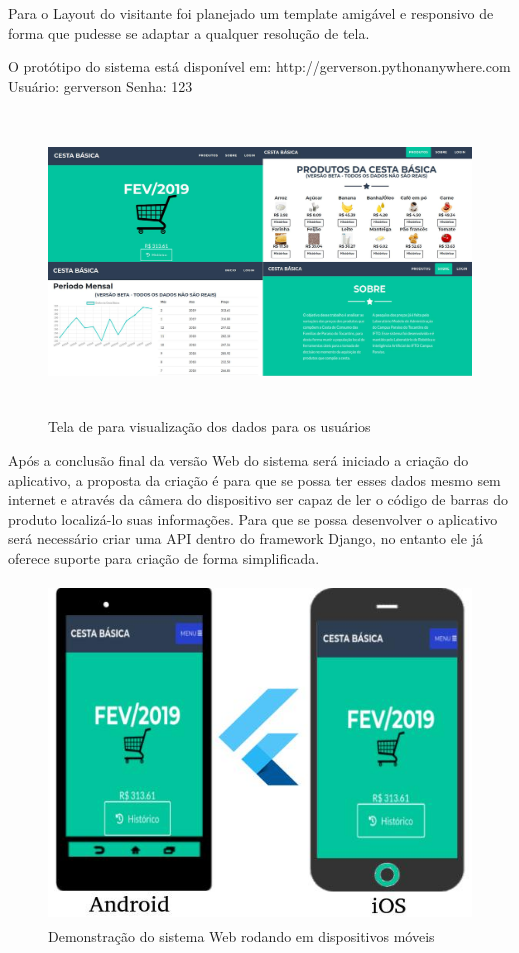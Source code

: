 \documentclass{ifto-tex}
\begin{document}
Para o Layout do visitante foi planejado um template amigável e responsivo de forma que pudesse se adaptar a qualquer resolução de tela.

O protótipo do sistema está disponível em: http://gerverson.pythonanywhere.com
Usuário: gerverson Senha: 123
	\begin{figure}[!h]
	\begin{center}
		\includegraphics[width=16.0cm, height= 8.0cm]{cestauser.jpeg}    %
		\caption{Tela de para visualização dos dados para os usuários} 
		\label{fig:faces}
	\end{center}
\end{figure}

Após a conclusão final da versão Web do sistema será iniciado a criação do aplicativo, a proposta da criação é para que se possa ter esses dados mesmo sem internet e através da câmera do dispositivo ser capaz de ler o código de barras do produto localizá-lo suas informações.
Para que se possa desenvolver o aplicativo será necessário criar uma API dentro do framework Django, no entanto ele já oferece suporte para criação de forma simplificada.

	\begin{figure}[!h]
	\begin{center}
		\includegraphics[width=12.0cm, height= 9.0cm]{cestadispositovos.jpeg}    %
		\caption{Demonstração do sistema Web rodando em dispositivos móveis} 
		\label{fig:faces}
	\end{center}
\end{figure}
\end{document}
